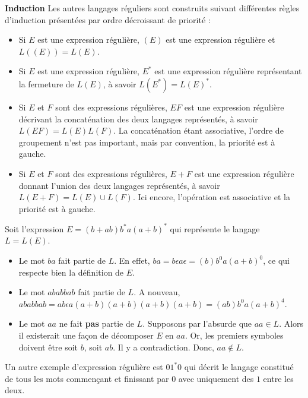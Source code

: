 \textbf{Induction}
Les autres langages réguliers sont construits suivant différentes règles d'induction présentées par ordre décroissant de priorité :

\begin{itemize}
	\item Si $E$ est une expression régulière, $(E)$ est une expression régulière et $L((E)) = L(E)$.
	\item Si $E$ est une expression régulière, $E^*$ est une expression régulière représentant la fermeture de $L(E)$, à savoir $L(E^*) = L(E)^*$.
	\item Si $E$ et $F$ sont des expressions régulières, $EF$ est une expression régulière décrivant la concaténation des deux langages représentés, à savoir $L(EF)=L(E)L(F)$. La concaténation étant associative, l'ordre de groupement n'est pas important, mais par convention, la priorité est à gauche.
	\item Si $E$ et $F$ sont des expressions régulières, $E+F$ est une expression régulière donnant l'union des deux langages représentés, à savoir $L(E+F)=L(E)\cup L(F)$. Ici encore, l'opération est associative et la priorité est à gauche.
\end{itemize}

\begin{example}
	Soit l'expression $E = (b+ab)b^*a(a+b)^*$ qui représente le langage $L=L(E)$.\\
	\begin{itemize}
		\item Le mot $ba$ fait partie de $L$. En effet, $ba=b\epsilon a \epsilon=(b)b^0a(a+b)^0$, ce qui respecte bien la définition de $E$.
		\item Le mot $ababbab$ fait partie de $L$. A nouveau, $ababbab=ab\epsilon a (a+b)(a+b)(a+b)(a+b)=(ab)b^0a(a+b)^4$.
		\item Le mot $aa$ ne fait \textbf{pas} partie de $L$. Supposons par l'absurde que $aa \in L$. Alors il existerait une façon de décomposer $E$ en $aa$. Or, les premiers symboles doivent être soit $b$, soit $ab$. Il y a contradiction. Donc, $aa \notin L$.
	\end{itemize}
	\label{ex:regex}
\end{example}

Un autre exemple d'expression régulière est $01^*0$ qui décrit le langage constitué de tous les mots commençant et finissant par $0$ avec uniquement des $1$ entre les deux.
